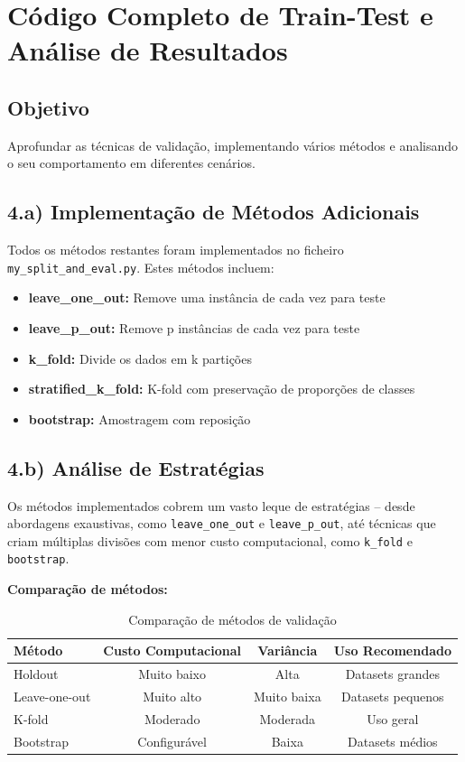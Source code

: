 \documentclass[12pt,a4paper]{article}
\begin{document}
\section{Código Completo de Train-Test e Análise de Resultados}

\subsection{Objetivo}

Aprofundar as técnicas de validação, implementando vários métodos e analisando o seu comportamento em diferentes cenários.

\subsection{4.a) Implementação de Métodos Adicionais}

Todos os métodos restantes foram implementados no ficheiro \texttt{my\_split\_and\_eval.py}. Estes métodos incluem:

\begin{itemize}
    \item \textbf{leave\_one\_out:} Remove uma instância de cada vez para teste
    \item \textbf{leave\_p\_out:} Remove p instâncias de cada vez para teste
    \item \textbf{k\_fold:} Divide os dados em k partições
    \item \textbf{stratified\_k\_fold:} K-fold com preservação de proporções de classes
    \item \textbf{bootstrap:} Amostragem com reposição
\end{itemize}

\subsection{4.b) Análise de Estratégias}

Os métodos implementados cobrem um vasto leque de estratégias -- desde abordagens exaustivas, como \texttt{leave\_one\_out} e \texttt{leave\_p\_out}, até técnicas que criam múltiplas divisões com menor custo computacional, como \texttt{k\_fold} e \texttt{bootstrap}.

\textbf{Comparação de métodos:}

\begin{table}[H]
\centering
\begin{tabular}{|l|c|c|c|}
\hline
\textbf{Método} & \textbf{Custo Computacional} & \textbf{Variância} & \textbf{Uso Recomendado} \\
\hline
Holdout & Muito baixo & Alta & Datasets grandes \\
Leave-one-out & Muito alto & Muito baixa & Datasets pequenos \\
K-fold & Moderado & Moderada & Uso geral \\
Bootstrap & Configurável & Baixa & Datasets médios \\
\hline
\end{tabular}
\caption{Comparação de métodos de validação}
\end{table}
\end{document}
